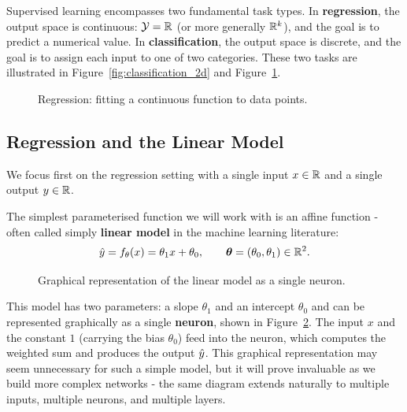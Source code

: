 Supervised learning encompasses two fundamental task types. In \textbf{regression}, the output space is continuous: $\mathcal{Y} = \mathbb{R}$ (or more generally $\mathbb{R}^k$), and the goal is to predict a numerical value. In \textbf{classification}, the output space is discrete, and the goal is to assign each input to one of two categories. These two tasks are illustrated in Figure~\ref{fig:classification_2d} and Figure~\ref{fig:regression_1d}.

\begin{figure}[h]
 \centering
 \begin{minipage}{0.45\textwidth}
 \centering
 \resizebox{\textwidth}{!}{}
 \caption{Binary classification: two classes separated by a decision boundary.}
 \label{fig:classification_2d}
 \end{minipage}
 \hfill
 \begin{minipage}{0.48\textwidth}
 \centering
 \resizebox{\textwidth}{!}{}
 \caption{Regression: fitting a continuous function to data points.}
 \label{fig:regression_1d}
 \end{minipage}
\end{figure}

\subsection{Regression and the Linear Model}

We focus first on the regression setting with a single input $x \in \mathbb{R}$ and a single output $y \in \mathbb{R}$.

The simplest parameterised function we will work with is an affine function - often called simply \textbf{linear model} in the machine learning literature:
\begin{equation}
 \hat{y} = f_\theta(x) = \theta_1 x + \theta_0, \qquad \boldsymbol{\theta} = (\theta_0, \theta_1) \in \mathbb{R}^2.
\end{equation}

\begin{figure}
 \centering
 \resizebox{0.25\textwidth}{!}{}
 \caption{Graphical representation of the linear model as a single neuron.}
 \label{fig:linear_neuron}
\end{figure}
This model has two parameters: a slope $\theta_1$ and an intercept $\theta_0$ and can be represented graphically as a single \textbf{neuron}, shown in Figure~\ref{fig:linear_neuron}. The input $x$ and the constant $1$ (carrying the bias $\theta_0$) feed into the neuron, which computes the weighted sum and produces the output $\hat{y}$. This graphical representation may seem unnecessary for such a simple model, but it will prove invaluable as we build more complex networks - the same diagram extends naturally to multiple inputs, multiple neurons, and multiple layers.

